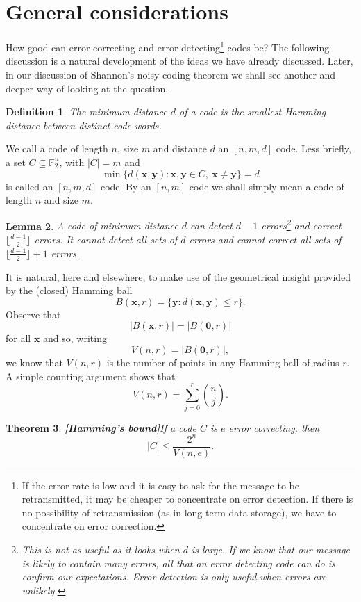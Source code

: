 \documentclass[12pt,a4paper]{article}
\theoremstyle{plain}
\newtheorem{theorem}{Theorem}[section]
\newtheorem{lemma}[theorem]{Lemma}
\newtheorem{definition}[theorem]{Definition}
\theoremstyle{definition}
\begin{document}
\section{General considerations} How good
can error correcting and error 
detecting\footnote{If the error rate is low and it is easy
to ask for the message to be retransmitted, it may be
cheaper to concentrate on error detection. If there is
no possibility of retransmission (as in long term data storage),
we have to concentrate on error correction.}
codes be? The following discussion is a natural
development of the ideas we have already
discussed. Later, in our discussion of Shannon's noisy coding
theorem we shall see another
and deeper way
of looking at the question. 
\begin{definition} The minimum distance $d$
of a code is the smallest Hamming distance
between distinct code words.
\end{definition}
We call a code of length $n$,  size $m$ and
distance $d$ an $[n,m,d]$ code. Less briefly,
a set $C\subseteq{\mathbb F}_{2}^{n}$,
with $|C|=m$ and
\[\min\{d({\mathbf x},{\mathbf y}):
{\mathbf x},{\mathbf y}\in C,\ {\mathbf x}\neq{\mathbf y}\}
=d\]
is called an $[n,m,d]$ code. By an $[n,m]$ code
we shall simply mean a code of length $n$
and size $m$.

\begin{lemma}\label{minimum distance}
A code of minimum distance
$d$ can detect $d-1$ errors\footnote{This is not
as useful as it looks when $d$ is large. If we know
that our message is likely to contain many
errors, all that an error detecting code
can do is confirm our expectations.
Error detection is only useful when errors are
unlikely.} and correct
$\lfloor\frac{d-1}{2}\rfloor$ errors.
It cannot detect all sets of $d$ errors
and cannot correct all sets of
$\lfloor\frac{d-1}{2}\rfloor+1$ errors.
\end{lemma}
It is natural, here and elsewhere, to make use
of the geometrical insight provided by the
(closed) Hamming ball
\[B({\mathbf x},r)=\{{\mathbf y}:
d({\mathbf x},{\mathbf y})\leq r\}.\]
Observe that
\[|B({\mathbf x},r)|=|B({\boldsymbol 0},r)|\]
for all ${\mathbf x}$ and so, writing
\[V(n,r)=|B({\boldsymbol 0},r)|,\]
we know that $V(n,r)$ is the number of points in any
Hamming ball of radius $r$. A simple counting
argument shows that
\[V(n,r)=\sum_{j=0}^{r}\binom{n}{j}.\]
\begin{theorem}{\bf [Hamming's bound]}\label{Hamming's bound} If a
code $C$ is $e$ error correcting, then
\[|C|\leq \frac{2^{n}}{V(n,e)}.\]
\end{theorem}
\end{document}
